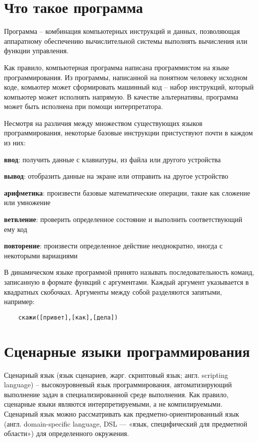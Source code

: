 \documentclass[../index.tex]{subfiles}
\begin{document}
\section{Что такое программа}

    Программа -- комбинация компьютерных инструкций и данных, позволяющая аппаратному обеспечению вычислительной системы выполнять вычисления или функции управления. 
    
    Как правило, компьютерная программа написана программистом на языке программирования. Из программы, написанной на понятном человеку исходном коде, комьютер может сформировать машинный код -- набор инструкций, который компьютер может исполнять напрямую. В качестве альтернативы, программа может быть исполнена при помощи интерпретатора.
    
    Несмотря на различия между множеством существующих языков программирования, некоторые базовые инструкции пристуствуют почти в каждом из них:
    
    \textbf{ввод}: получить данные с клавиатуры, из файла или другого устройства
    
    \textbf{вывод}: отобразить данные на экране или отправить на другое устройство
    
    \textbf{арифметика}: произвести базовые математические операции, такие как сложение или умножение
    
    \textbf{ветвление}: проверить определенное состояние и выполнить соответствующий ему код
    
    \textbf{повторение}: произвести определенное действие неоднократно, иногда с некоторыми вариациями
        
        
    В динамическом языке программой принято называть последовательность команд, записанную в формате функций с аргументами.
    Каждый аргумент указывается в квадратных скобочках. Аргументы между собой разделяются запятыми, например: 
    \begin{verbatim}
    скажи([привет],[как],[дела])
    \end{verbatim}

    \section{Сценарные языки программирования}
        Сценарный язык (язык сценариев, жарг. скриптовый язык; англ. scripting language) -- высокоуровневый язык программирования, автоматизирующий выполнение задач в специализированной среде выполнения. 
        Как правило, сценарные языки являются интерпретируемыми, а не компилируемыми. Сценарный язык 
        можно рассматривать как предметно-ориентированный язык (англ. domain-specific language, DSL — «язык, специфический для предметной области») для определенного окружения.
        
\end{document}
